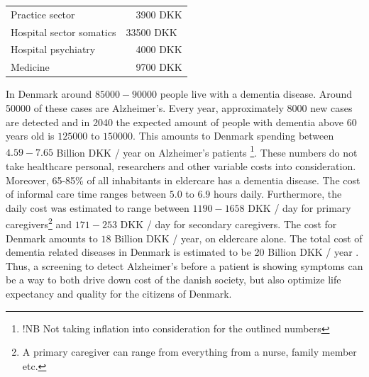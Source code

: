 \documentclass[11pt, fleqn, titlepage]{article}
\newcommand{\1}[1]{\mathds{1}\left[#1\right]}
\begin{document}
		
		\begin{table}[H]
			\begin{tabular}{ll}
				Practice sector   &\ \ 3900  DKK  \\
				Hospital sector somatics  & 33500 DKK \\
				Hospital psychiatry  &  \ \ 4000  DKK  \\
				Medicine & \ \ 9700  DKK 
			\end{tabular}
		\end{table}
		
		In Denmark around $ 85000-90000 $ people live with a dementia disease. Around 50000 of these cases are Alzheimer's. Every year, approximately $ 8000 $ new cases are detected and in 2040 the expected amount of people with dementia above 60 years old is $ 125000 $ to $ 150000 $. This amounts to Denmark spending between $ 4.59-7.65$ Billion DKK / year on Alzheimer's patients \footnote{!NB Not taking inflation into consideration for the outlined numbers}. These numbers do not take healthcare personal, researchers and other variable costs into consideration. Moreover, 65-85\% of all inhabitants in eldercare has a dementia disease. The cost of informal care time ranges between $ 5.0 $ to $ 6.9 $ hours daily. Furthermore, the daily cost was estimated to range between $ 1190 - 1658 $ DKK / day for primary caregivers\footnote{A primary caregiver can range from everything from a nurse, family member etc.} and $ 171 - 253 $ DKK / day for secondary caregivers. The cost for Denmark amounts to $ 18 $ Billion DKK / year, on eldercare alone. The total cost of dementia related diseases in Denmark is estimated to be 20 Billion DKK / year \cite{Alzheimerforeningen, informal_care}. Thus, a screening to detect Alzheimer's before a patient is showing symptoms can be a way to both drive down cost of the danish society, but also optimize life expectancy and quality for the citizens of Denmark.
		
\end{document}
